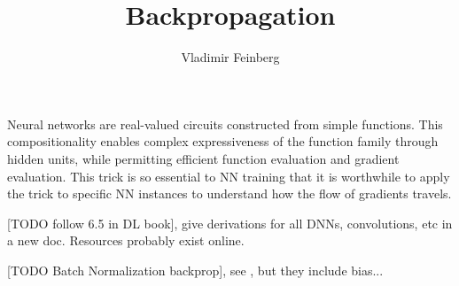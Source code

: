 \documentclass{article}
\title{Backpropagation}
\author{Vladimir Feinberg}
\begin{document}
\maketitle

Neural networks are real-valued circuits constructed from simple functions. This compositionality enables complex expressiveness of the function family through hidden units, while permitting efficient function evaluation and gradient evaluation. This trick is so essential to NN training that it is worthwhile to apply the trick to specific NN instances to understand how the flow of gradients travels.

[TODO follow 6.5 in DL book], give derivations for all DNNs, convolutions, etc in a new doc. Resources probably exist online.

[TODO Batch Normalization backprop], see , but they include bias...
\end{document}
